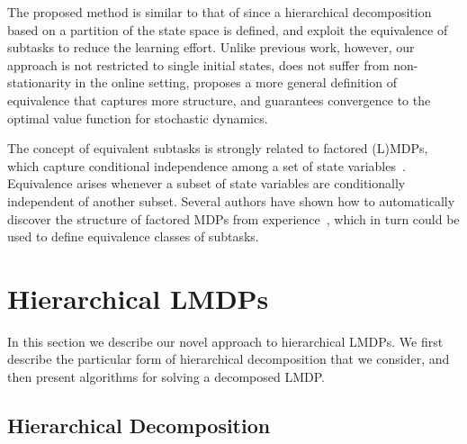 
The proposed method is similar to that of \citet{Wen2020} since a hierarchical decomposition based on a partition of the state space is defined, and exploit the equivalence of subtasks to reduce the learning effort. Unlike previous work, however, our approach is not restricted to single initial states, does not suffer from non-stationarity in the online setting, proposes a more general definition of equivalence that captures more structure, and guarantees convergence to the optimal value function for stochastic dynamics.

The concept of equivalent subtasks is strongly related to factored (L)MDPs, which capture conditional independence among a set of state variables~\citep{Boutilier1995, Koller2000}. Equivalence arises whenever a subset of state variables are conditionally independent of another subset. Several authors have shown how to automatically discover the structure of factored MDPs from experience~\citep{Strehl2007,Kolobov2012}, which in turn could be used to define equivalence classes of subtasks.


\section{Hierarchical LMDPs}

In this section we describe our novel approach to hierarchical LMDPs. We first describe the particular form of hierarchical decomposition that we consider, and then present algorithms for solving a decomposed LMDP.

\subsection{Hierarchical Decomposition}


